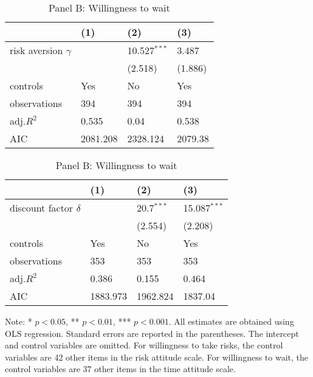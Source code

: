 \documentclass[12pt]{article}
\begin{document}
\begin{table}
    \captionsetup[sub]{singlelinecheck=false}
    \caption{Regression results for the Preference Survey Module}
    \vspace*{12pt}
    
    \begin{subtable}{\textwidth}
        \centering
        \captionsetup{justification=centering}
        \caption*{Panel A: Willingness to take risks} 
       \begin{tabular}{llll}
\hline
 & (1) & (2) & (3) \\
\hline
risk aversion  $\gamma$ &  & 10.527$^{***}$ & 3.487 \\
 &  & (2.518) & (1.886) \\
controls & Yes & No & Yes \\
observations & 394 & 394 & 394 \\
adj.$R^2$ & 0.535 & 0.04 & 0.538 \\
AIC & 2081.208 & 2328.124 & 2079.38 \\
\hline
\end{tabular}
    \end{subtable}
    
    \vspace*{12pt}

    \begin{subtable}{\textwidth}
        \centering
        \captionsetup{justification=centering}
        \caption*{Panel B: Willingness to wait}
        \begin{tabular}{llll}
\hline
 & (1) & (2) & (3) \\
\hline
discount factor $\delta$ &  & 20.7$^{***}$ & 15.087$^{***}$ \\
 &  & (2.554) & (2.208) \\
controls & Yes & No & Yes \\
observations & 353 & 353 & 353 \\
adj.$R^2$ & 0.386 & 0.155 & 0.464 \\
AIC & 1883.973 & 1962.824 & 1837.04 \\
\hline
\end{tabular}
    \end{subtable} 

    \vspace*{4pt}
    \centering
    \begin{minipage}{0.85\textwidth}
    {\par\footnotesize Note: * $p<0.05$, ** $p<0.01$, *** $p<0.001$. All estimates are obtained using OLS regression. Standard errors are reported in the parentheses. The intercept and control variables are omitted. For willingness to take risks, the control variables are 42 other items in the risk attitude scale. For willingness to wait, the control variables are 37 other items in the time attitude scale.}
    \end{minipage}
    \label{tab:psm}
\end{table}
\end{document}
